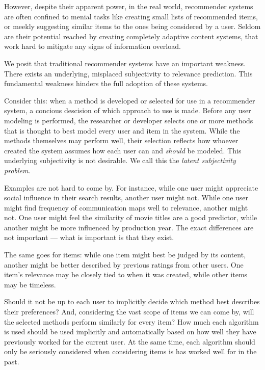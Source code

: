 However, despite their apparent power, in the real world, recommender systems are often confined
to menial tasks like creating small lists of recommended items, 
or meekly suggesting similar items to the ones being considered by a user.
Seldom are their potential reached by creating completely adaptive
content systems, that work hard to mitigate any signs of information overload.

We posit that traditional recommender systems have an important weakness.
There exists an underlying, misplaced subjectivity to relevance prediction.
This fundamental weakness hinders the full adoption of these systems.

Consider this: 
when a method is developed or selected for use in a recommender system,
a concious descision of which approach to use is made.
Before any user modeling is performed, the researcher or developer selects
one or more methods that is thought to best model every user and item in the system.
While the methods themselves may perform well, their selection
reflects how whoever created the system assumes how each user
can and \emph{should} be modeled. This underlying subjectivity is not desirable.
We call this the \emph{latent subjectivity problem}.

Examples are not hard to come by.
For instance, while one user might appreciate social
influence in their search results, another user might not.
While one user might find frequency of communication maps well to relevance,
another might not. 
One user might feel the similarity of movie titles are a good predictor,
while another might be more influenced by production year.
The exact differences are not important --- what is important is that they exist.

The same goes for items: while one item might best be judged by its content,
another might be better described by previous ratings from other users.
One item's relevance may be closely tied to when it was created,
while other items may be timeless.

Should it not be up to each user to implicitly decide which method best describes their preferences?
And, considering the vast scope of items we can come by, will the selected
methods perform similarly for every item?
How much each algorithm is used should be used implicitly and automatically
based on how well they have previously worked for the current user.
At the same time, each algorithm should only be seriously considered
when considering items is has worked well for in the past.

